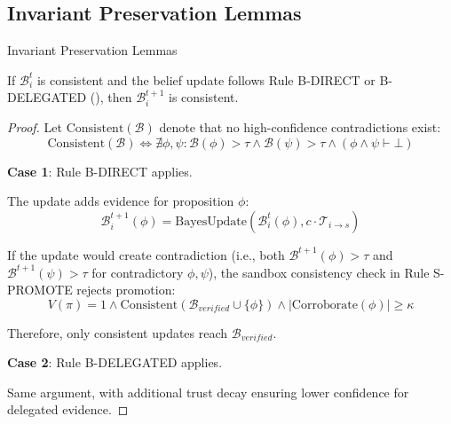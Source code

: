\documentclass[
  ignorenonframetext,
]{beamer}
\providecommand{\cref}[1]{\texttt{\detokenize{#1}}}
\begin{document}
\subsection{Invariant Preservation Lemmas}\label{sec:invariant-lemmas}

\begin{frame}[allowframebreaks]{Invariant Preservation Lemmas}
\begin{lemma}
\label{lem:belief-consistency}
If $\mathcal{B}_i^t$ is consistent and the belief update follows Rule B-DIRECT or B-DELEGATED (\cref{sec:belief-update-rules}), then $\mathcal{B}_i^{t+1}$ is consistent.
\end{lemma}

\begin{proof}
Let $\text{Consistent}(\mathcal{B})$ denote that no high-confidence contradictions exist:
\begin{equation}
\label{eq:consistency-def}
\text{Consistent}(\mathcal{B}) \iff \nexists \phi, \psi: \mathcal{B}(\phi) > \tau \land \mathcal{B}(\psi) > \tau \land (\phi \land \psi \vdash \bot)
\end{equation}

\textbf{Case 1}: Rule B-DIRECT applies.

The update adds evidence for proposition $\phi$:
\begin{equation}
\label{eq:direct-update}
\mathcal{B}_i^{t+1}(\phi) = \text{BayesUpdate}(\mathcal{B}_i^t(\phi), c \cdot \mathcal{T}_{i \to s})
\end{equation}

If the update would create contradiction (i.e., both $\mathcal{B}^{t+1}(\phi) > \tau$ and $\mathcal{B}^{t+1}(\psi) > \tau$ for contradictory $\phi, \psi$), the sandbox consistency check in Rule S-PROMOTE rejects promotion:
\begin{equation}
\label{eq:promote-condition}
V(\pi) = 1 \land \text{Consistent}(\mathcal{B}_{verified} \cup \{\phi\}) \land |\text{Corroborate}(\phi)| \geq \kappa
\end{equation}

Therefore, only consistent updates reach $\mathcal{B}_{verified}$.

\textbf{Case 2}: Rule B-DELEGATED applies.

Same argument, with additional trust decay ensuring lower confidence for delegated evidence.
\end{proof}

\end{frame}
\end{document}
